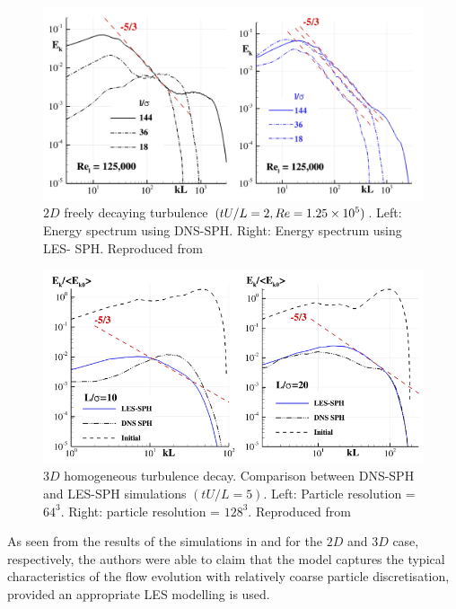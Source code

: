 \begin{figure}[H]
    \centering
    \includegraphics[scale=0.5]{Figures/research_papers/DiMascio2017-fig-4.png}
    \caption{$2D$ freely decaying turbulence $(tU/L = 2, Re = 1.25 \times {10}^{5})$. Left: Energy spectrum using DNS-SPH. Right: Energy spectrum using LES- SPH. Reproduced from \cite{DiMascio2017}}
    \label{fig:DiMascio2017-fig-4}
\end{figure}
\begin{figure}[H]
    \centering
    \includegraphics[scale=0.75]{Figures/research_papers/DiMascio2017-fig-9.png}
    \caption{$3D$ homogeneous turbulence decay. Comparison between DNS-SPH and LES-SPH simulations $(tU/L = 5)$. Left: Particle resolution = $64^3$. Right: particle resolution = $128^3$. Reproduced from \cite{DiMascio2017}}
    \label{fig:DiMascio2017-fig-9}
\end{figure}

 As seen from the results of the simulations in  and  for the $2D$ and $3D$ case, respectively, the authors were able to claim that the model captures the typical characteristics of the flow evolution with relatively coarse particle discretisation, provided an appropriate LES modelling is used.

